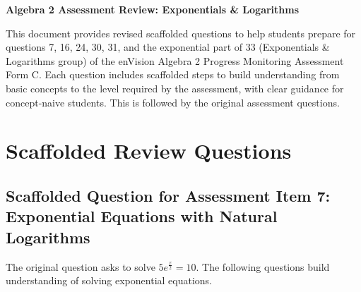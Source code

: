\documentclass[12pt]{article}
\begin{document}
\begin{center}
    \textbf{Algebra 2 Assessment Review: Exponentials \& Logarithms}
\end{center}

This document provides revised scaffolded questions to help students prepare for questions 7, 16, 24, 30, 31, and the exponential part of 33 (Exponentials \& Logarithms group) of the enVision Algebra 2 Progress Monitoring Assessment Form C. Each question includes scaffolded steps to build understanding from basic concepts to the level required by the assessment, with clear guidance for concept-naive students. This is followed by the original assessment questions.

\section*{Scaffolded Review Questions}

\subsection*{Scaffolded Question for Assessment Item 7: Exponential Equations with Natural Logarithms}
The original question asks to solve \( 5e^{\frac{x}{2}} = 10 \). The following questions build understanding of solving exponential equations.
\end{document}
